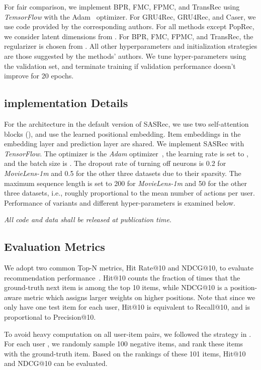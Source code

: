 \documentclass[conference]{IEEEtran}
\begin{document}
For fair comparison, we implement BPR, FMC, FPMC, and TransRec using \emph{TemsorFlow} with the Adam~\cite{DBLP:journals/corr/KingmaB14} optimizer. For GRU4Rec, GRU4Rec, and Caser, we use 
code provided by the
corresponding authors. For all methods except PopRec, 
we consider latent dimensions 
from . For BPR, FMC, FPMC, and TransRec, the  regularizer is 
chosen
from . All other hyperparameters and initialization strategies are 
those suggested by the methods' authors.
We tune hyper-parameters using the validation set, and terminate 
training if 
validation performance doesn't improve for 20 epochs.


\subsection{implementation Details}

For the architecture in the default version of SASRec,
we 
use
two
self-attention blocks (), and use the learned positional embedding. Item embeddings in the embedding layer and prediction layer are shared.
We implement SASRec with \emph{TensorFlow}. 
The optimizer is the \emph{Adam} optimizer~\cite{DBLP:journals/corr/KingmaB14}, the learning rate is set to , and the batch size is . The dropout rate of turning off neurons is 0.2 for \emph{MovieLens-1m} and 0.5 for the other three datasets due to their sparsity. The maximum sequence length  is set to 200 for \emph{MovieLens-1m} and 50 for the other three datasets,
i.e., roughly proportional to the mean number of actions per user.
Performance of variants and different hyper-parameters is examined below.

\emph{All code and data shall be released at publication time}.




\subsection{Evaluation Metrics}

We adopt two common Top-N metrics, Hit Rate@10 and NDCG@10, to evaluate recommendation performance~\cite{NeuMF,DBLP:conf/recsys/HeKM17}.
Hit@10 counts the fraction of times that the ground-truth next item is 
among the
top 10 items, while NDCG@10 is a position-aware metric which assigns larger weights on higher positions. Note that since we only have one test item for each user, Hit@10 is equivalent to Recall@10, and is proportional to Precision@10.

To avoid heavy computation on all user-item pairs, we followed the strategy in \cite{koren2008factorization,NeuMF}. For each user , we randomly sample 100 negative items, and rank these items with the ground-truth item. Based on the rankings of these 101 items, Hit@10 and NDCG@10 can be evaluated.
\end{document}
